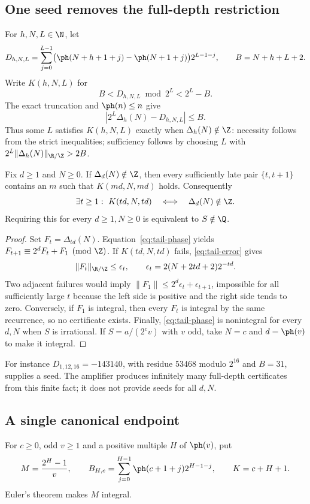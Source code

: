 \documentclass[11pt]{article}
\begin{document}
\subsection{One seed removes the full-depth restriction}
For $h,N,L\in\N$, let
\[
 D_{h,N,L}=\sum_{j=0}^{L-1}
   \bigl(\ph(N+h+1+j)-\ph(N+1+j)\bigr)2^{L-1-j},
 \qquad B=N+h+L+2.
\]
Write $K(h,N,L)$ for
\[
 B<D_{h,N,L}\bmod2^L<2^L-B.
\]
The exact truncation and $\ph(n)\le n$ give
\begin{equation}\label{eq:tail-error}
 |2^L\Delta_h(N)-D_{h,N,L}|\le B.
\end{equation}
Thus some $L$ satisfies $K(h,N,L)$ exactly when $\Delta_h(N)\notin\Z$:
necessity follows from the strict inequalities; sufficiency follows by
choosing $L$ with $2^L\|\Delta_h(N)\|_{\R/\Z}>2B$.

\begin{theorem}\label{res:fulldepth}
Fix $d\ge1$ and $N\ge0$. If $\Delta_d(N)\notin\Z$, then every sufficiently
late pair $\{t,t+1\}$ contains an $m$ such that $K(md,N,md)$ holds.
Consequently
\[
 \exists t\ge1:\ K(td,N,td)
 \quad\Longleftrightarrow\quad\Delta_d(N)\notin\Z.
\]
Requiring this for every $d\ge1,N\ge0$ is equivalent to $S\notin\Q$.
\end{theorem}
\begin{proof}
Set $F_t=\Delta_{td}(N)$. Equation~\eqref{eq:tail-phase} yields
$F_{t+1}\equiv2^dF_t+F_1\pmod\Z$. If $K(td,N,td)$ fails,
\eqref{eq:tail-error} gives
\[
 \|F_t\|_{\R/\Z}\le\epsilon_t,
 \qquad \epsilon_t=2(N+2td+2)2^{-td}.
\]
Two adjacent failures would imply
$\|F_1\|\le2^d\epsilon_t+\epsilon_{t+1}$, impossible for all sufficiently
large $t$ because the left side is positive and the right side tends to zero.
Conversely, if $F_1$ is integral, then every $F_t$ is integral by the same
recurrence, so no certificate exists. Finally, \eqref{eq:tail-phase} is
nonintegral for every $d,N$ when $S$ is irrational. If
$S=a/(2^cv)$ with $v$ odd, take $N=c$ and $d=\ph(v)$ to make it integral.
\end{proof}
For instance $D_{1,12,16}=-143140$, with residue $53468$ modulo $2^{16}$
and $B=31$, supplies a seed. The amplifier produces infinitely many
full-depth certificates from this finite fact; it does not provide seeds
for all $d,N$.

\subsection{A single canonical endpoint}\label{sec:frontier}
For $c\ge0$, odd $v\ge1$ and a positive multiple $H$ of $\ph(v)$, put
\[
 M=\frac{2^H-1}{v},\qquad
 B_{H,c}=\sum_{j=0}^{H-1}\ph(c+1+j)2^{H-1-j},\qquad K=c+H+1.
\]
Euler's theorem makes $M$ integral.
\end{document}
